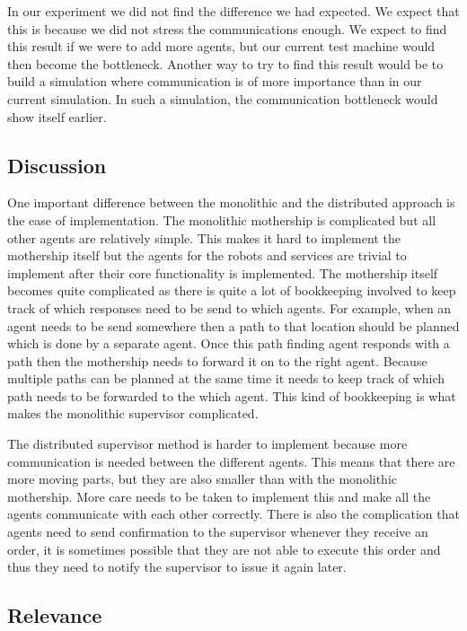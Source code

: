 In our experiment we did not find the difference we had expected. We expect
that this is because we did not stress the communications enough. We expect
to find this result if we were to add more agents, but our current test
machine would then become the bottleneck. Another way to try to find this
result would be to build a simulation where communication is of more
importance than in our current simulation. In such a simulation, the
communication bottleneck would show itself earlier. 

\subsection{Discussion}

One important difference between the monolithic and the distributed approach is
the ease of implementation. The monolithic mothership is complicated but all
other agents are relatively simple. This makes it hard to implement the
mothership itself but the agents for the robots and services are trivial to
implement after their core functionality is implemented. The mothership itself
becomes quite complicated as there is quite a lot of bookkeeping involved to
keep track of which responses need to be send to which agents. For example,
when an agent needs to be send somewhere then a path to that location should
be planned which is done by a separate agent. Once this path finding agent
responds with a path then the mothership needs to forward it on to the right
agent. Because multiple paths can be planned at the same time it needs to keep
track of which path needs to be forwarded to the which agent. This kind of
bookkeeping is what makes the monolithic supervisor complicated.

The distributed supervisor method is harder to implement because more
communication is needed between the different agents. This means that there are
more moving parts, but they are also smaller than with the monolithic
mothership. More care needs to be taken to implement this and make all the
agents communicate with each other correctly. There is also the complication
that agents need to send confirmation to the supervisor whenever they receive
an order, it is sometimes possible that they are not able to execute this order
and thus they need to notify the supervisor to issue it again later.

\subsection{Relevance}


